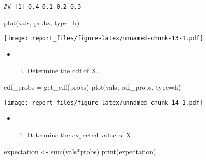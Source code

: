 \documentclass[
]{article}
\newenvironment{Shaded}{\begin{snugshade}}{\end{snugshade}}
\newcommand{\AttributeTok}[1]{\textcolor[rgb]{0.77,0.63,0.00}{#1}}
\newcommand{\FunctionTok}[1]{\textcolor[rgb]{0.00,0.00,0.00}{#1}}
\newcommand{\NormalTok}[1]{#1}
\newcommand{\OtherTok}[1]{\textcolor[rgb]{0.56,0.35,0.01}{#1}}
\newcommand{\SpecialCharTok}[1]{\textcolor[rgb]{0.00,0.00,0.00}{#1}}
\newcommand{\StringTok}[1]{\textcolor[rgb]{0.31,0.60,0.02}{#1}}
\providecommand{\tightlist}{%
  \setlength{\itemsep}{0pt}\setlength{\parskip}{0pt}}
\begin{document}
\begin{verbatim}
## [1] 0.4 0.1 0.2 0.3
\end{verbatim}

\begin{Shaded}
\begin{Highlighting}[]
\FunctionTok{plot}\NormalTok{(vals, probs, }\AttributeTok{type=}\StringTok{\textquotesingle{}h\textquotesingle{}}\NormalTok{)}
\end{Highlighting}
\end{Shaded}

\texttt{[image: report\_files/figure-latex/unnamed-chunk-13-1.pdf]}\\

\begin{itemize}
\item
  \begin{enumerate}
  \def\labelenumi{\alph{enumi})}
  \setcounter{enumi}{1}
  \tightlist
  \item
    Determine the cdf of X.
  \end{enumerate}
\end{itemize}

\begin{Shaded}
\begin{Highlighting}[]
\NormalTok{cdf\_probs }\OtherTok{=} \FunctionTok{get\_cdf}\NormalTok{(probs)}
\FunctionTok{plot}\NormalTok{(vals, cdf\_probs, }\AttributeTok{type=}\StringTok{\textquotesingle{}h\textquotesingle{}}\NormalTok{)}
\end{Highlighting}
\end{Shaded}

\texttt{[image: report\_files/figure-latex/unnamed-chunk-14-1.pdf]}\\

\begin{itemize}
\item
  \begin{enumerate}
  \def\labelenumi{\alph{enumi})}
  \setcounter{enumi}{2}
  \tightlist
  \item
    Determine the expected value of X.
  \end{enumerate}
\end{itemize}

\begin{Shaded}
\begin{Highlighting}[]
\NormalTok{expectation }\OtherTok{\textless{}{-}} \FunctionTok{sum}\NormalTok{(vals}\SpecialCharTok{*}\NormalTok{probs)}
\FunctionTok{print}\NormalTok{(expectation)}
\end{Highlighting}
\end{Shaded}
\end{document}
